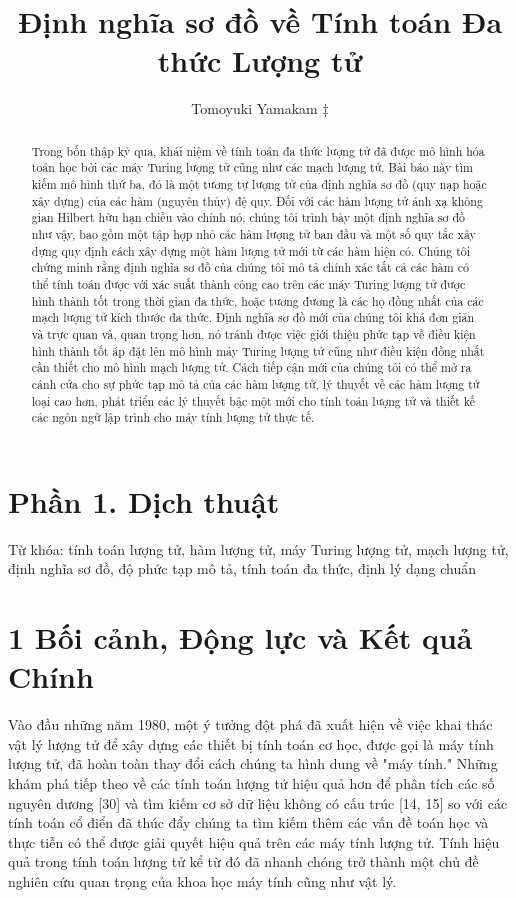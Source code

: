 \documentclass[10pt]{article}
\title{Định nghĩa sơ đồ về Tính toán Đa thức Lượng tử}
\author{Tomoyuki Yamakam ‡}
\date{}
\begin{document}
\maketitle

\section*{Phần 1. Dịch thuật}

\begin{abstract}
Trong bốn thập kỷ qua, khái niệm về tính toán đa thức lượng tử đã được mô hình hóa toán học bởi các máy Turing lượng tử cũng như các mạch lượng tử. Bài báo này tìm kiếm mô hình thứ ba, đó là một tương tự lượng tử của định nghĩa sơ đồ (quy nạp hoặc xây dựng) của các hàm (nguyên thủy) đệ quy. Đối với các hàm lượng tử ánh xạ không gian Hilbert hữu hạn chiều vào chính nó, chúng tôi trình bày một định nghĩa sơ đồ như vậy, bao gồm một tập hợp nhỏ các hàm lượng tử ban đầu và một số quy tắc xây dựng quy định cách xây dựng một hàm lượng tử mới từ các hàm hiện có. Chúng tôi chứng minh rằng định nghĩa sơ đồ của chúng tôi mô tả chính xác tất cả các hàm có thể tính toán được với xác suất thành công cao trên các máy Turing lượng tử được hình thành tốt trong thời gian đa thức, hoặc tương đương là các họ đồng nhất của các mạch lượng tử kích thước đa thức. Định nghĩa sơ đồ mới của chúng tôi khá đơn giản và trực quan và, quan trọng hơn, nó tránh được việc giới thiệu phức tạp về điều kiện hình thành tốt áp đặt lên mô hình máy Turing lượng tử cũng như điều kiện đồng nhất cần thiết cho mô hình mạch lượng tử. Cách tiếp cận mới của chúng tôi có thể mở ra cánh cửa cho sự phức tạp mô tả của các hàm lượng tử, lý thuyết về các hàm lượng tử loại cao hơn, phát triển các lý thuyết bậc một mới cho tính toán lượng tử và thiết kế các ngôn ngữ lập trình cho máy tính lượng tử thực tế.
\end{abstract}

Từ khóa: tính toán lượng tử, hàm lượng tử, máy Turing lượng tử, mạch lượng tử, định nghĩa sơ đồ, độ phức tạp mô tả, tính toán đa thức, định lý dạng chuẩn

\section*{1 Bối cảnh, Động lực và Kết quả Chính}
Vào đầu những năm 1980, một ý tưởng đột phá đã xuất hiện về việc khai thác vật lý lượng tử để xây dựng các thiết bị tính toán cơ học, được gọi là máy tính lượng tử, đã hoàn toàn thay đổi cách chúng ta hình dung về "máy tính." Những khám phá tiếp theo về các tính toán lượng tử hiệu quả hơn để phân tích các số nguyên dương [30] và tìm kiếm cơ sở dữ liệu không có cấu trúc [14, 15] so với các tính toán cổ điển đã thúc đẩy chúng ta tìm kiếm thêm các vấn đề toán học và thực tiễn có thể được giải quyết hiệu quả trên các máy tính lượng tử. Tính hiệu quả trong tính toán lượng tử kể từ đó đã nhanh chóng trở thành một chủ đề nghiên cứu quan trọng của khoa học máy tính cũng như vật lý.
\end{document}
